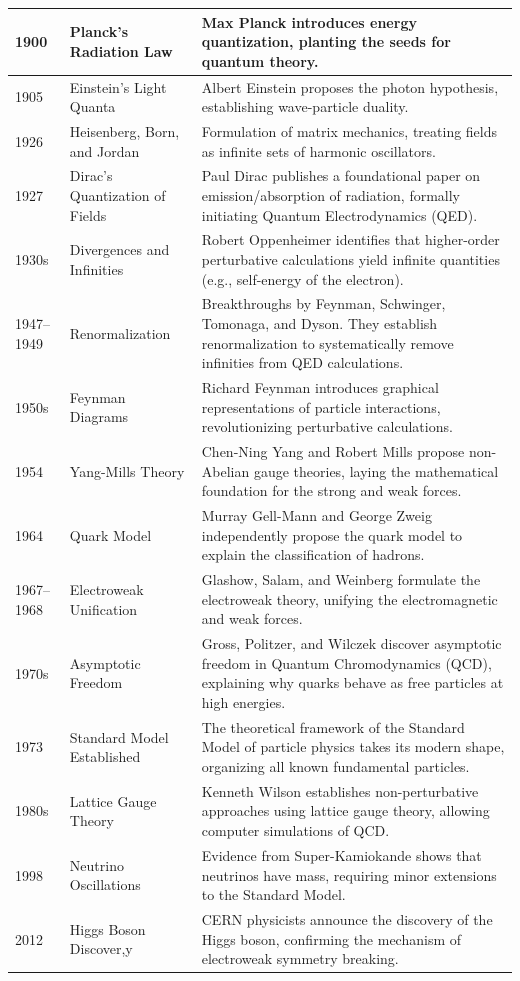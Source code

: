 \documentclass[a4paper, 10pt, onepage]{elegantbook}
\begin{document}
\begin{longtable}{p{} p{} p{}}
1900 & Planck's Radiation Law & Max Planck introduces energy quantization, planting the seeds for quantum theory. \\
\midrule
1905 & Einstein's Light Quanta & Albert Einstein proposes the photon hypothesis, establishing wave-particle duality. \\
\midrule
1926 & Heisenberg, Born, and Jordan & Formulation of matrix mechanics, treating fields as infinite sets of harmonic oscillators. \\
\midrule
1927 & Dirac's Quantization of Fields & Paul Dirac publishes a foundational paper on emission/absorption of radiation, formally initiating Quantum Electrodynamics (QED). \\
\midrule
1930s & Divergences and Infinities & Robert Oppenheimer identifies that higher-order perturbative calculations yield infinite quantities (e.g., self-energy of the electron). \\
\midrule
1947--1949 & Renormalization & Breakthroughs by Feynman, Schwinger, Tomonaga, and Dyson. They establish renormalization to systematically remove infinities from QED calculations. \\
\midrule
1950s & Feynman Diagrams & Richard Feynman introduces graphical representations of particle interactions, revolutionizing perturbative calculations. \\
\midrule
1954 & Yang-Mills Theory & Chen-Ning Yang and Robert Mills propose non-Abelian gauge theories, laying the mathematical foundation for the strong and weak forces. \\
\midrule
1964 & Quark Model & Murray Gell-Mann and George Zweig independently propose the quark model to explain the classification of hadrons. \\
\midrule
1967--1968 & Electroweak Unification & Glashow, Salam, and Weinberg formulate the electroweak theory, unifying the electromagnetic and weak forces. \\
\midrule
1970s & Asymptotic Freedom & Gross, Politzer, and Wilczek discover asymptotic freedom in Quantum Chromodynamics (QCD), explaining why quarks behave as free particles at high energies. \\
\midrule
1973 & Standard Model Established & The theoretical framework of the Standard Model of particle physics takes its modern shape, organizing all known fundamental particles. \\
\midrule
1980s & Lattice Gauge Theory & Kenneth Wilson establishes non-perturbative approaches using lattice gauge theory, allowing computer simulations of QCD. \\
\midrule
1998 & Neutrino Oscillations & Evidence from Super-Kamiokande shows that neutrinos have mass, requiring minor extensions to the Standard Model. \\
\midrule
2012 & Higgs Boson Discover,y & CERN physicists announce the discovery of the Higgs boson, confirming the mechanism of electroweak symmetry breaking. \\
\bottomrule
\end{longtable}
\end{document}
